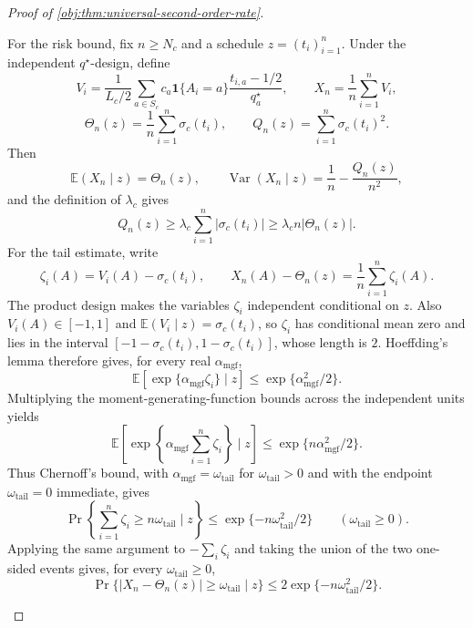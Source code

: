 \documentclass[11pt]{article}
\begin{document}
\begin{proof}[Proof of \cref{obj:thm:universal-second-order-rate}]
\begin{enumerate}
For the risk bound, fix \(n\ge N_c\) and a schedule \(z=(t_i)_{i=1}^n\). Under the independent \(q^\star\)-design, define
\[
V_i=\frac{1}{L_c/2}
\sum_{a\in S_c}
c_a\mathbf 1\{A_i=a\}\frac{t_{i,a}-1/2}{q_a^\star},
\qquad
X_n=\frac1n\sum_{i=1}^n V_i,
\]
\[
\Theta_n(z)=\frac1n\sum_{i=1}^n\sigma_c(t_i),
\qquad
Q_n(z)=\sum_{i=1}^n\sigma_c(t_i)^2 .
\]
Then
\[
\mathbb E(X_n\mid z)=\Theta_n(z),
\qquad
\operatorname{Var}(X_n\mid z)=\frac1n-\frac{Q_n(z)}{n^2},
\]
and the definition of \(\lambda_c\) gives
\[
Q_n(z)\ge \lambda_c\sum_{i=1}^n|\sigma_c(t_i)|
\ge \lambda_c n|\Theta_n(z)|.
\]
For the tail estimate, write
\[
\zeta_i(A)=V_i(A)-\sigma_c(t_i),
\qquad
X_n(A)-\Theta_n(z)=\frac1n\sum_{i=1}^n\zeta_i(A).
\]
The product design makes the variables \(\zeta_i\) independent conditional on \(z\). Also \(V_i(A)\in[-1,1]\) and \(\mathbb E(V_i\mid z)=\sigma_c(t_i)\), so \(\zeta_i\) has conditional mean zero and lies in the interval \([-1-\sigma_c(t_i),1-\sigma_c(t_i)]\), whose length is \(2\). Hoeffding's lemma therefore gives, for every real \(\alpha_{\mathrm{mgf}}\),
\[
\mathbb E\!\left[\exp\{\alpha_{\mathrm{mgf}}\zeta_i\}\mid z\right]
\le
\exp\{\alpha_{\mathrm{mgf}}^2/2\}.
\]
Multiplying the moment-generating-function bounds across the independent units yields
\[
\mathbb E\!\left[\exp\!\left\{\alpha_{\mathrm{mgf}}\sum_{i=1}^n\zeta_i\right\}\mid z\right]
\le
\exp\{n\alpha_{\mathrm{mgf}}^2/2\}.
\]
Thus Chernoff's bound, with \(\alpha_{\mathrm{mgf}}=\omega_{\mathrm{tail}}\) for \(\omega_{\mathrm{tail}}>0\) and with the endpoint \(\omega_{\mathrm{tail}}=0\) immediate, gives
\[
\Pr\!\left\{\sum_{i=1}^n\zeta_i\ge n\omega_{\mathrm{tail}}\mid z\right\}
\le \exp\{-n\omega_{\mathrm{tail}}^2/2\}
\qquad(\omega_{\mathrm{tail}}\ge0).
\]
Applying the same argument to \(-\sum_i\zeta_i\) and taking the union of the two one-sided events gives, for every \(\omega_{\mathrm{tail}}\ge0\),
\[
\Pr\{|X_n-\Theta_n(z)|\ge \omega_{\mathrm{tail}}\mid z\}
\le 2\exp\{-n\omega_{\mathrm{tail}}^2/2\}.
\]


\end{enumerate}
\end{proof}
\end{document}
